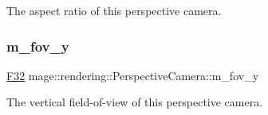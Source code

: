 The aspect ratio of this perspective camera. \hypertarget{classmage_1_1rendering_1_1_perspective_camera_afa70744921fce139d518730f998bd566}{}\label{classmage_1_1rendering_1_1_perspective_camera_afa70744921fce139d518730f998bd566} 
\subsubsection{\texorpdfstring{m\+\_\+fov\+\_\+y}{m\_fov\_y}}
{\footnotesize\ttfamily \hyperlink{namespacemage_aa97e833b45f06d60a0a9c4fc22ae02c0}{F32} mage\+::rendering\+::\+Perspective\+Camera\+::m\+\_\+fov\+\_\+y\hspace{0.3cm}{\ttfamily [private]}}

The vertical field-\/of-\/view of this perspective camera. 